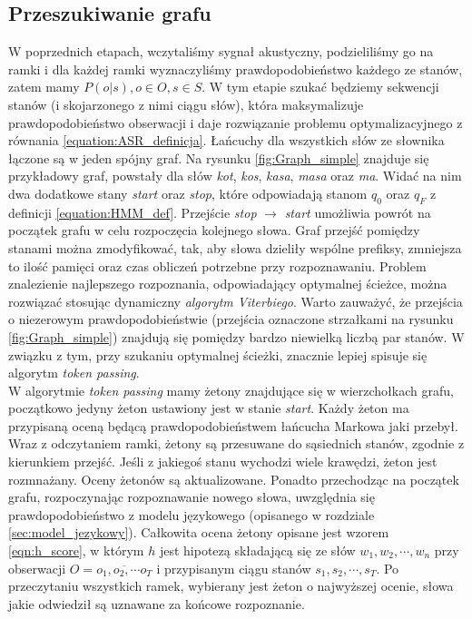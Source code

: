 \documentclass[a4paper,11pt,onecolumn,twoside,openright,titlepage]{article}
\begin{document}
	\subsection{Przeszukiwanie grafu}
		W poprzednich etapach, wczytaliśmy sygnał akustyczny, podzieliliśmy go na ramki i dla każdej ramki wyznaczyliśmy prawdopodobieństwo każdego ze stanów, zatem mamy $P(o|s), o \in O, s \in S$. W tym etapie szukać będziemy sekwencji stanów (i skojarzonego z nimi ciągu słów), która maksymalizuje  prawdopodobieństwo obserwacji i daje rozwiązanie problemu optymalizacyjnego z równania \ref{equation:ASR_definicja}. Łańcuchy dla wszystkich słów ze słownika łączone są w jeden spójny graf. Na rysunku \ref{fig:Graph_simple} znajduje się przykładowy graf, powstały dla słów \textit{kot}, \textit{kos}, \textit{kasa}, \textit{masa} oraz \textit{ma}. Widać na nim dwa dodatkowe stany \textit{start} oraz \textit{stop}, które odpowiadają stanom $q_0$ oraz $q_F$ z definicji \ref{equation:HMM_def}. Przejście \textit{stop} $\longrightarrow$ \textit{start} umożliwia powrót na początek grafu w celu rozpoczęcia kolejnego słowa. Graf przejść pomiędzy stanami można zmodyfikować, tak, aby słowa dzieliły wspólne prefiksy, zmniejsza to ilość pamięci oraz czas obliczeń potrzebne przy rozpoznawaniu. Problem znalezienie najlepszego rozpoznania, odpowiadający optymalnej ścieżce, można rozwiązać stosując dynamiczny \textit{algorytm Viterbiego}. Warto zauważyć, że przejścia o niezerowym prawdopodobieństwie (przejścia oznaczone strzałkami na rysunku \ref{fig:Graph_simple}) znajdują się pomiędzy bardzo niewielką liczbą par stanów. W związku z tym, przy szukaniu optymalnej ścieżki, znacznie lepiej spisuje się algorytm \textit{token passing}. 
		\\
		W algorytmie \textit{token passing} mamy żetony znajdujące się w wierzchołkach grafu, początkowo jedyny żeton ustawiony jest w stanie \textit{start}. Każdy żeton ma przypisaną oceną będącą prawdopodobieństwem łańcucha Markowa jaki przebył. Wraz z odczytaniem ramki, żetony są przesuwane do sąsiednich stanów, zgodnie z kierunkiem przejść. Jeśli z jakiegoś stanu wychodzi wiele krawędzi, żeton jest rozmnażany. Oceny żetonów są aktualizowane. Ponadto przechodząc na początek grafu, rozpoczynając rozpoznawanie nowego słowa, uwzględnia się prawdopodobieństwo z modelu językowego (opisanego w rozdziale \ref{sec:model_jezykowy}). Całkowita ocena żetony opisane jest wzorem \ref{eqn:h_score}, w którym $h$ jest hipotezą składającą się ze słów $w_1,w_2,\cdots, w_n$ przy obserwacji  $O=\overline{o_1,o_2,\cdots o_T}$ i przypisanym ciągu stanów $s_1,s_2,\cdots,s_T$. Po przeczytaniu wszystkich ramek, wybierany jest żeton o najwyższej ocenie, słowa jakie odwiedził są uznawane za końcowe rozpoznanie.
		
\end{document}

